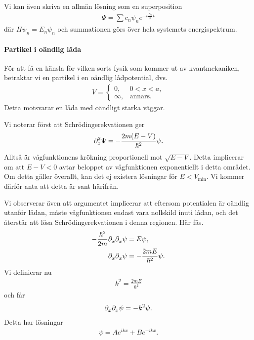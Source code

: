 Vi kan även skriva en allmän lösning som en superposition
\begin{align*}
	\Psi = \sum c_{n}\psi_{n}e^{-i\frac{E_{n}}{\hbar}t}
\end{align*}
där $H\psi_{n} = E_{n}\psi_{n}$ och summationen görs över hela systemets energispektrum.

\paragraph{Partikel i oändlig låda}
För att få en känsla för vilken sorts fysik som kommer ut av kvantmekaniken, betraktar vi en partikel i en oändlig lådpotential, dvs.
\begin{align*}
	V = 
	\begin{cases}
		0,      &0 < x < a, \\
		\infty, &\text{annars.}
	\end{cases}
\end{align*}
Detta motsvarar en låda med oändligt starka väggar.

Vi noterar först att Schrödingerekvationen ger
\begin{align*}
	\del[2]{x}{\Psi} = -\frac{2m(E - V)}{\hbar^{2}}\psi.
\end{align*}
Alltså är vågfunktionens krökning proportionell mot $\sqrt{E - V}$. Detta implicerar om att $E - V < 0$ avtar beloppet av vågfunktionen exponentiellt i detta området. Om detta gäller överallt, kan det ej existera lösningar för $E < V_{\text{min}}$. Vi kommer därför anta att detta är sant härifrån.

Vi observerar även att argumentet implicerar att eftersom potentialen är oändlig utanför lådan, måste vågfunktionen endast vara nollskild inuti lådan, och det återstår att lösa Schrödingerekvationen i denna regionen. Här fås.
\begin{align*}
	-\frac{\hbar^{2}}{2m}\del{x}{\del{x}{\psi}} &= E\psi, \\
	\del{x}{\del{x}{\psi}}                      &= -\frac{2mE}{\hbar^{2}}\psi.
\end{align*}
Vi definierar nu
\begin{align*}
	k^{2} = \frac{2mE}{\hbar^{2}}
\end{align*}
och får
\begin{align*}
	\del{x}{\del{x}{\psi}} = -k^{2}\psi.
\end{align*}
Detta har lösningar
\begin{align*}
	\psi = Ae^{ikx} + Be^{-ikx}.
\end{align*}

